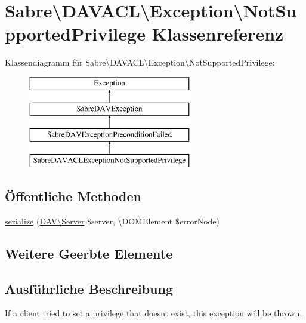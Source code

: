 \hypertarget{class_sabre_1_1_d_a_v_a_c_l_1_1_exception_1_1_not_supported_privilege}{}\section{Sabre\textbackslash{}D\+A\+V\+A\+CL\textbackslash{}Exception\textbackslash{}Not\+Supported\+Privilege Klassenreferenz}
\label{class_sabre_1_1_d_a_v_a_c_l_1_1_exception_1_1_not_supported_privilege}
Klassendiagramm für Sabre\textbackslash{}D\+A\+V\+A\+CL\textbackslash{}Exception\textbackslash{}Not\+Supported\+Privilege\+:\begin{figure}[H]
\begin{center}
\leavevmode
\includegraphics[height=4.000000cm]{class_sabre_1_1_d_a_v_a_c_l_1_1_exception_1_1_not_supported_privilege}
\end{center}
\end{figure}
\subsection*{Öffentliche Methoden}
\begin{DoxyCompactItemize}
\item 
\mbox{\hyperlink{class_sabre_1_1_d_a_v_a_c_l_1_1_exception_1_1_not_supported_privilege_a0070b3b25fbde2a61667d25936873d50}{serialize}} (\mbox{\hyperlink{class_sabre_1_1_d_a_v_1_1_server}{D\+A\+V\textbackslash{}\+Server}} \$server, \textbackslash{}D\+O\+M\+Element \$error\+Node)
\end{DoxyCompactItemize}
\subsection*{Weitere Geerbte Elemente}


\subsection{Ausführliche Beschreibung}
If a client tried to set a privilege that doesn\textquotesingle{}t exist, this exception will be thrown.

